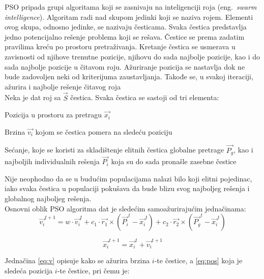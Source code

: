 \documentclass[a4paper]{article}
\begin{document}
PSO pripada grupi algoritama koji se zasnivaju na inteligenciji roja
(eng.~{\em swarm intelligence}). Algoritam radi nad skupom jedinki koji se naziva rojem. 
Elementi ovog skupa, odnosno jedinke, se nazivaju česticama. 
Svaka čestica predstavlja jedno potencijalno rešenje problema koji se rešava. 
Čestice se prema zadatim pravilima kreću po prostoru pretraživanja. 
Kretanje čestica se usmerava u zavisnosti od njihove trenutne pozicije, 
njihovu do sada najbolje pozicije, kao i do sada najbolje pozicije u čitavom roju. 
Ažuriranje pozicija se nastavlja dok ne bude zadovoljen neki od kriterijuma zaustavljanja.
Takođe se, u svakoj iteraciji, ažurira i najbolje rešenje čitavog roja \\


Neka je dat roj sa $\vec{S}$ čestica. Svaka čestica se sastoji od tri elementa:
\begin{list}{•}{}
	\item Pozicija u prostoru za pretragu $\vec{x_i}$
	\item Brzina $\vec{v_i}$ kojom se čestica pomera na sledeću poziciju
	\item Sećanje, koje se koristi za skladištenje elitnih čestica 
	globalne pretrage $\vec{P_g}$, kao i najboljih individualnih 
	rešenja $\vec{P_i}$ koja su do sada pronašle zasebne čestice\\
\end{list}

Nije neophodno da se u budućim populacijama nalazi bilo koji elitni pojedinac, iako svaka čestica u populaciji pokušava da bude blizu svog najboljeg rešenja i globalnog najboljeg rešenja. \\ 


Osnovni oblik PSO algoritma dat je sledećim samoažurirajućim jednačinama: \\ 
\begin{equation}\label{eq:v}
\vec{v_{i}}^{t+1} = w \cdot \vec{v_{i}}^{t} + c_1 \cdot \vec{r_1} \times (\vec{P_{i}}^{t} - \vec{x_{i}}^{t}) + c_2\cdot \vec{r_2} \times (\vec{P_{g}}^{t} - \vec{x_{i}}^{t}) 
\end{equation}

\begin{equation}\label{eq:pos}
\vec{x_{i}}^{t+1} = \vec{x_{i}}^{t} + \vec{v_{i}}^{t+1} 
\end{equation}

Jednačina \ref{eq:v} opisuje kako se ažurira brzina $i$-te čestice, a \ref{eq:pos} koja je sledeća pozicija $i$-te čestice, pri čemu je: 
\end{document}
